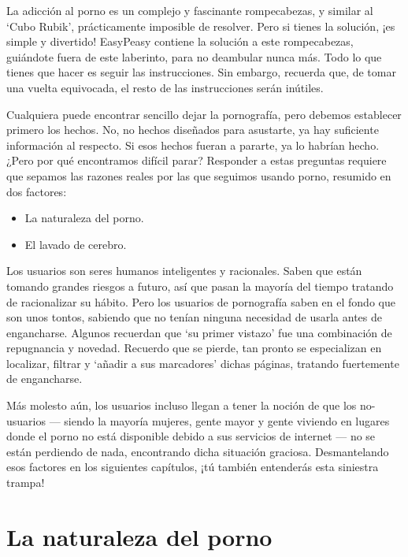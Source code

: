 \documentclass[
  spanish,
  openany]{book}
\providecommand{\tightlist}{%
  \setlength{\itemsep}{0pt}\setlength{\parskip}{0pt}}
\begin{document}
La adicción al porno es un complejo y fascinante rompecabezas, y similar al `Cubo Rubik', prácticamente imposible de resolver. Pero si tienes la solución, ¡es simple y divertido! EasyPeasy contiene la solución a este rompecabezas, guiándote fuera de este laberinto, para no deambular nunca más. Todo lo que tienes que hacer es seguir las instrucciones. Sin embargo, recuerda que, de tomar una vuelta equivocada, el resto de las instrucciones serán inútiles.

Cualquiera puede encontrar sencillo dejar la pornografía, pero debemos establecer primero los hechos. No, no hechos diseñados para asustarte, ya hay suficiente información al respecto. Si esos hechos fueran a pararte, ya lo habrían hecho. ¿Pero por qué encontramos difícil parar? Responder a estas preguntas requiere que sepamos las razones reales por las que seguimos usando porno, resumido en dos factores:

\begin{itemize}
\tightlist
\item
  La naturaleza del porno.
\item
  El lavado de cerebro.
\end{itemize}

Los usuarios son seres humanos inteligentes y racionales. Saben que están tomando grandes riesgos a futuro, así que pasan la mayoría del tiempo tratando de racionalizar su hábito. Pero los usuarios de pornografía saben en el fondo que son unos tontos, sabiendo que no tenían ninguna necesidad de usarla antes de engancharse. Algunos recuerdan que `su primer vistazo' fue una combinación de repugnancia y novedad. Recuerdo que se pierde, tan pronto se especializan en localizar, filtrar y `añadir a sus marcadores' dichas páginas, tratando fuertemente de engancharse.

Más molesto aún, los usuarios incluso llegan a tener la noción de que los no-usuarios --- siendo la mayoría mujeres, gente mayor y gente viviendo en lugares donde el porno no está disponible debido a sus servicios de internet --- no se están perdiendo de nada, encontrando dicha situación graciosa. Desmantelando esos factores en los siguientes capítulos, ¡tú también entenderás esta siniestra trampa!

\hypertarget{la-naturaleza-del-porno}{%
\chapter{La naturaleza del porno}\label{la-naturaleza-del-porno}}
\end{document}
